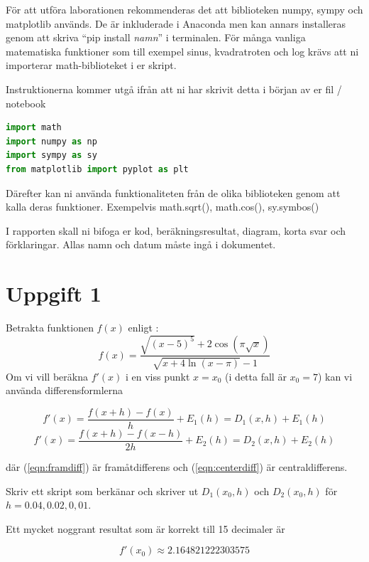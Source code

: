 \documentclass[a4paper]{article}
\begin{document}
För att utföra laborationen rekommenderas det att biblioteken numpy,
sympy och matplotlib används. De är inkluderade i Anaconda men kan annars installeras genom att
skriva ``pip install \textit{namn}'' i terminalen. För många vanliga matematiska funktioner som till 
exempel sinus, kvadratroten och log krävs att ni importerar math-biblioteket i er skript.

Instruktionerna kommer utgå ifrån att ni har skrivit detta i början av er fil / notebook
\begin{lstlisting}[language=Python]
import math 
import numpy as np
import sympy as sy
from matplotlib import pyplot as plt
\end{lstlisting}

Därefter kan ni använda funktionaliteten från de olika biblioteken genom att
kalla deras funktioner. Exempelvis math.sqrt(), math.cos(), sy.symbos()

I rapporten skall ni bifoga er kod, beräkningsresultat, diagram, korta svar och förklaringar.
Allas namn och datum måste ingå i dokumentet.

\newpage
\section{Uppgift 1}

Betrakta funktionen \( f(x) \) enligt :
\begin{equation} \label{eqn:fxq1}
  f(x)=\frac{\sqrt{(x-5)^5}+2\cos (\pi\sqrt{x})}{\sqrt{x+4 \ln (x-\pi)}-1}
\end{equation}
Om vi vill beräkna \( f'(x) \) i en viss punkt \( x=x_0 \)
(i detta fall är \( x_0=7 \)) kan vi använda differensformlerna

\begin{equation} \label{eqn:framdiff}
  f'(x)=\frac{f(x+h)-f(x)}{h}+E_1(h)=D_1(x,h)+E_1(h)
\end{equation}
\begin{equation} \label{eqn:centerdiff}
  f'(x)=\frac{f(x+h)-f(x-h)}{2h}+E_2(h)=D_2(x,h)+E_2(h)
\end{equation}

där (\ref{eqn:framdiff}) är framåtdifferens och (\ref{eqn:centerdiff}) är centraldifferens.

Skriv ett skript som berkänar och skriver ut \( D_1(x_0,h) \)
och  \( D_2(x_0,h) \) för \( h=0.04,0.02,0,01 \).

Ett mycket noggrant resultat som är korrekt till 15 decimaler är

\begin{equation} \label{eqn:fxexakt}
  f'(x_0)\approx 2.164821222303575
\end{equation}
\end{document}
